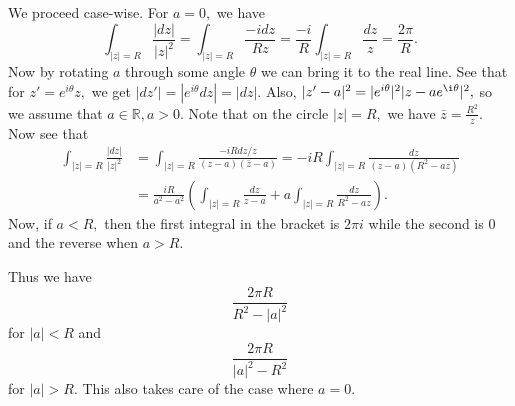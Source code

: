\documentclass{article}
\begin{document}
\section{} %
 We proceed case-wise. For $a=0,$ we have 
 $$\int_{|z| =R} \frac{|dz|}{|z|^2}=\int_{|z| = R} \frac{-i dz}{Rz} = \frac{-i}{R} \int_{|z| = R} \frac{dz}{z}=\frac{2\pi}{R}.$$
 Now by rotating $a$ through some angle $\theta$ we can bring it to the real line. See that for $z'= e^{i\theta}z,$ we get 
 $|dz'| =|e^{i\theta}dz|=|dz|.$ Also, $|z'-a|^2=|e^{i\theta}|^2|z-ae^{\i\theta}|^2,$ so we assume that $a \in \mathbb{R}, a >0.$
  Note that on the circle $|z|=R,$ we have $\bar{z}= \frac{R^2}{z}.$ Now see that 
  \begin{align*}
  	\int_{|z| =R} \frac{|dz|}{|z|^2} &= \int_{|z| =R} \frac{-iR dz/z}{(z-a)(\bar{z}-a)}= -iR\int_{|z| =R} \frac{dz}{(z-a)(R^2-az)}\\
  	&= \frac{iR}{a^2-a^2} \left( \int_{|z| = R}\frac{dz}{z-a}+ a \int_{|z| = R} \frac{dz}{R^2- az} \right).
  \end{align*}
Now, if $a < R,$ then the first integral in the bracket is $2\pi i$ while the second is $0$ and the reverse when $a > R.$

Thus we have $$\frac{2\pi R}{R^2- |a|^2} $$ for $|a|<R$ and $$\frac{2\pi R}{|a|^2-R^2} $$ for $|a| >R.$ This also takes care of the case where $a=0.$
\end{document}
